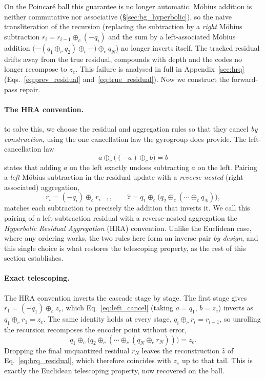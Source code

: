 \documentclass[12pt]{report}
\begin{document}
On the Poincar\'e ball this guarantee is no longer automatic. M\"obius addition is neither commutative nor associative (\S\ref{sec:bg_hyperbolic}), so the naive transliteration of the recursion (replacing the subtraction by a \emph{right} M\"obius subtraction $r_i=r_{i-1}\oplus_c(-q_i)$ and the sum by a left-associated M\"obius addition $\big(\cdots(q_1\oplus_c q_2)\oplus_c\cdots\big)\oplus_c q_{N}$) no longer inverts itself. The tracked residual drifts away from the true residual, compounds with depth and the codes no longer recompose to $z_e$. This failure is analysed in full in Appendix~\ref{sec:hrq} (Eqs.~\ref{eq:prev_residual} and~\ref{eq:true_residual}). Now we construct the forward-pass repair.

\paragraph{The HRA convention.} to solve this, we choose the residual and aggregation rules so that they cancel \emph{by construction}, using the one cancellation law the gyrogroup does provide. The left-cancellation law
\begin{equation}
    \label{eq:left_cancel}
    a \oplus_c\big((-a)\oplus_c b\big) = b
\end{equation}
states that adding $a$ on the left exactly undoes subtracting $a$ on the left. Pairing a \emph{left} M\"obius subtraction in the residual update with a \emph{reverse-nested} (right-associated) aggregation,
\begin{equation}
    \label{eq:hrq_residual}
    r_i = (-q_i)\oplus_c r_{i-1},
    \qquad
    \hat z = q_1\oplus_c\big(q_2\oplus_c(\cdots\oplus_c q_{N})\big),
\end{equation}
matches each subtraction to precisely the addition that inverts it. We call this pairing of a left-subtraction residual with a reverse-nested aggregation the \emph{Hyperbolic Residual Aggregation} (HRA) convention. Unlike the Euclidean case, where any ordering works, the two rules here form an inverse pair \emph{by design}, and this single choice is what restores the telescoping property, as the rest of this section establishes.

\paragraph{Exact telescoping.} The HRA convention inverts the cascade stage by stage. The first stage gives $r_1=(-q_1)\oplus_c z_e$, which Eq.~\ref{eq:left_cancel} (taking $a=q_1$, $b=z_e$) inverts as $q_1\oplus_c r_1=z_e$. The same identity holds at every stage, $q_i\oplus_c r_i=r_{i-1}$, so unrolling the recursion recomposes the encoder point without error,
\begin{equation*}
    q_1\oplus_c\big(q_2\oplus_c(\cdots\oplus_c(q_{N}\oplus_c r_{N}))\big)=z_e .
\end{equation*}
Dropping the final unquantized residual $r_{N}$ leaves the reconstruction $\hat z$ of Eq.~\ref{eq:hrq_residual}, which therefore coincides with $z_e$ up to that tail. This is exactly the Euclidean telescoping property, now recovered on the ball.
\end{document}
